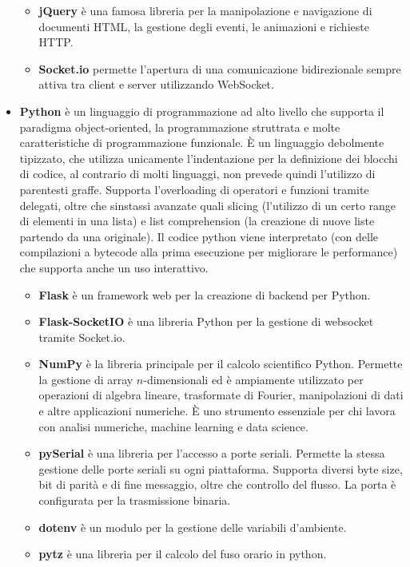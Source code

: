 \documentclass[12pt,a4paper,openright,twoside]{book}
\begin{document}
\begin{itemize}[noitemsep]
\begin{itemize}[noitemsep]
            \item \textbf{jQuery} è una famosa libreria per la manipolazione e navigazione di documenti HTML, la gestione degli eventi, le animazioni e richieste HTTP.
            \item \textbf{Socket.io} permette l'apertura di una comunicazione bidirezionale sempre attiva tra client e server utilizzando WebSocket.
        \end{itemize}
        \item \textbf{Python} è un linguaggio di programmazione ad alto livello che supporta il paradigma object-oriented, la programmazione struttrata e molte caratteristiche di programmazione funzionale. È un linguaggio debolmente tipizzato, che utilizza unicamente l'indentazione per la definizione dei blocchi di codice, al contrario di molti linguaggi, non prevede quindi l'utilizzo di parentesti graffe. Supporta l'overloading di operatori e funzioni tramite delegati, oltre che sinstassi avanzate quali slicing (l'utilizzo di un certo range di elementi in una lista) e list comprehension (la creazione di nuove liste partendo da una originale). Il codice python viene interpretato (con delle compilazioni a bytecode alla prima esecuzione per migliorare le performance) che supporta anche un uso interattivo.
        \begin{itemize}[noitemsep]
            \item \textbf{Flask} è un framework web per la creazione di backend per Python.
            \item \textbf{Flask-SocketIO} è una libreria Python per la gestione di websocket tramite Socket.io.
            \item \textbf{NumPy} è la libreria principale per il calcolo scientifico Python. Permette la gestione di array $n$-dimensionali ed è ampiamente utilizzato per operazioni di algebra lineare, trasformate di Fourier, manipolazioni di dati e altre applicazioni numeriche. È uno strumento essenziale per chi lavora con analisi numeriche, machine learning e data science.
            \item \textbf{pySerial} è una libreria per l'accesso a porte seriali. Permette la stessa gestione delle porte seriali su ogni piattaforma. Supporta diversi byte size, bit di parità e di fine messaggio, oltre che controllo del flusso. La porta è configurata per la trasmissione binaria.
            \item \textbf{dotenv} è un modulo per la gestione delle variabili d'ambiente.
            \item \textbf{pytz} è una libreria per il calcolo del fuso orario in python.

\end{itemize}
\end{itemize}
\end{document}
